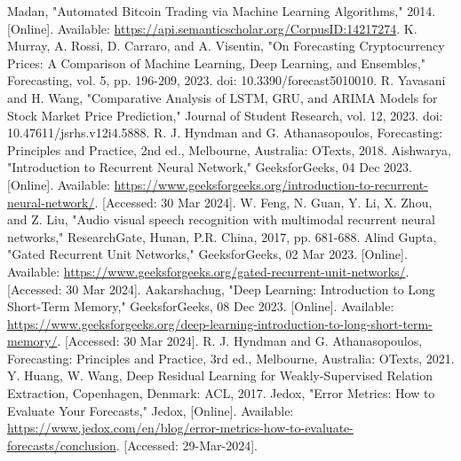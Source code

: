 \documentclass{ieeeojies}
\begin{document}
\begin{thebibliography}{00}
 Madan, "Automated Bitcoin Trading via Machine Learning Algorithms," 2014. [Online]. Available: \url{https://api.semanticscholar.org/CorpusID:14217274}.
 K. Murray, A. Rossi, D. Carraro, and A. Visentin, "On Forecasting Cryptocurrency Prices: A Comparison of Machine Learning, Deep Learning, and Ensembles," Forecasting, vol. 5, pp. 196-209, 2023. doi: 10.3390/forecast5010010.
 R. Yavasani and H. Wang, "Comparative Analysis of LSTM, GRU, and ARIMA Models for Stock Market Price Prediction," Journal of Student Research, vol. 12, 2023. doi: 10.47611/jsrhs.v12i4.5888.
 R. J. Hyndman and G. Athanasopoulos, Forecasting: Principles and Practice, 2nd ed., Melbourne, Australia: OTexts, 2018.
 Aishwarya, "Introduction to Recurrent Neural Network," GeeksforGeeks, 04 Dec 2023. [Online]. Available: \url{https://www.geeksforgeeks.org/introduction-to-recurrent-neural-network/}. [Accessed: 30 Mar 2024].
 W. Feng, N. Guan, Y. Li, X. Zhou, and Z. Liu, "Audio visual speech recognition with multimodal recurrent neural networks," ResearchGate, Hunan, P.R. China, 2017, pp. 681-688.
 Alind Gupta, "Gated Recurrent Unit Networks," GeeksforGeeks, 02 Mar 2023. [Online]. Available: \url{https://www.geeksforgeeks.org/gated-recurrent-unit-networks/}. [Accessed: 30 Mar 2024].
 Aakarshachug, "Deep Learning: Introduction to Long Short-Term Memory," GeeksforGeeks, 08 Dec 2023. [Online]. Available: \url{https://www.geeksforgeeks.org/deep-learning-introduction-to-long-short-term-memory/}. [Accessed: 30 Mar 2024].
 R. J. Hyndman and G. Athanasopoulos, Forecasting: Principles and Practice, 3rd ed., Melbourne, Australia: OTexts, 2021.
 Y. Huang, W. Wang, Deep Residual Learning for Weakly-Supervised Relation Extraction, Copenhagen, Denmark: ACL, 2017.
 Jedox, "Error Metrics: How to Evaluate Your Forecasts," Jedox, [Online]. Available: \url{https://www.jedox.com/en/blog/error-metrics-how-to-evaluate-forecasts/conclusion}. [Accessed: 29-Mar-2024].

\end{thebibliography}


\EOD
\end{document}
